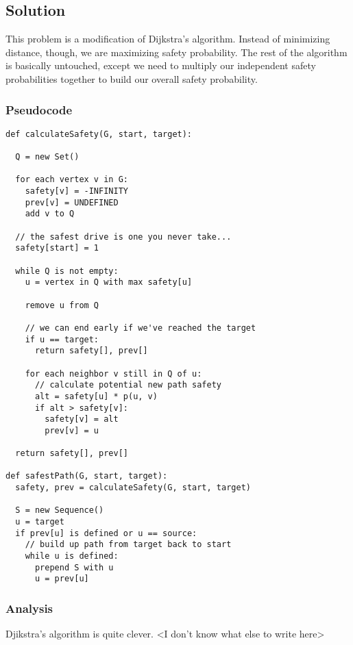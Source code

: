 \subsection*{Solution}

This problem is a modification of Dijkstra's algorithm. Instead of minimizing distance, though, we are maximizing safety probability. The rest of the algorithm is basically untouched, except we need to multiply our independent safety probabilities together to build our overall safety probability.

\subsubsection*{Pseudocode}
\begin{verbatim}
def calculateSafety(G, start, target):

  Q = new Set()

  for each vertex v in G:
    safety[v] = -INFINITY
    prev[v] = UNDEFINED
    add v to Q

  // the safest drive is one you never take...
  safety[start] = 1 
  
  while Q is not empty:
    u = vertex in Q with max safety[u]

    remove u from Q

    // we can end early if we've reached the target
    if u == target:
      return safety[], prev[]

    for each neighbor v still in Q of u:
      // calculate potential new path safety 
      alt = safety[u] * p(u, v)
      if alt > safety[v]:
        safety[v] = alt
        prev[v] = u

  return safety[], prev[]

def safestPath(G, start, target):
  safety, prev = calculateSafety(G, start, target)

  S = new Sequence()
  u = target
  if prev[u] is defined or u == source:
    // build up path from target back to start
    while u is defined:
      prepend S with u
      u = prev[u]
\end{verbatim}

\subsubsection*{Analysis}

Djikstra's algorithm is quite clever. <I don't know what else to write here>
